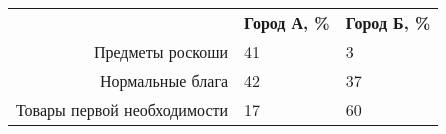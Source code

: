 \documentclass{article}
\begin{document}
\begin{minipage}{\textwidth}
\centering
\begin{tabularx}{0.7\textwidth}{rYY}
\toprule
 & \textbf{Город А, \%} & \textbf{Город Б, \%} \\
\cmidrule(lr){2-2}\cmidrule(lr){3-3}
Предметы роскоши & 41 & 3 \\

Нормальные блага & 42 & 37 \\

Товары первой необходимости & 17 & 60 \\
\bottomrule
\end{tabularx}
\label{task4}
\end{minipage} \\[35pt]
\end{document}
